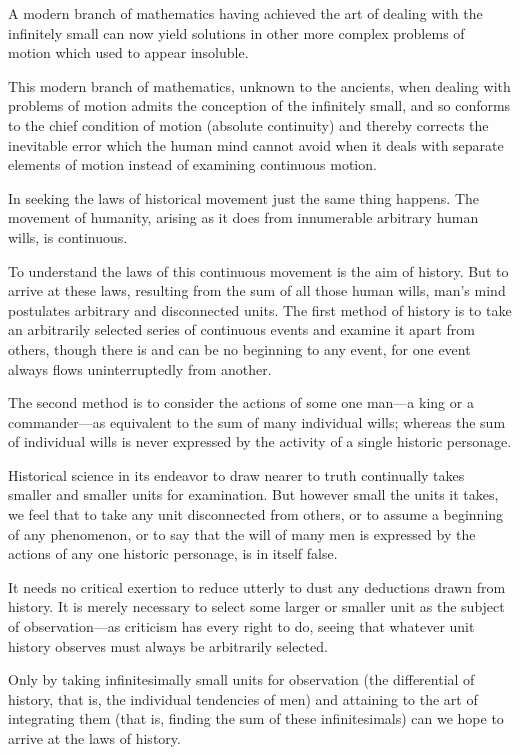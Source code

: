 A modern branch of mathematics having achieved the art of dealing
with the infinitely small can now yield solutions in other more
complex problems of motion which used to appear insoluble.

This modern branch of mathematics, unknown to the ancients, when
dealing with problems of motion admits the conception of the
infinitely small, and so conforms to the chief condition of
motion (absolute continuity) and thereby corrects the inevitable
error which the human mind cannot avoid when it deals with
separate elements of motion instead of examining continuous
motion.

In seeking the laws of historical movement just the same thing
happens.  The movement of humanity, arising as it does from
innumerable arbitrary human wills, is continuous.

To understand the laws of this continuous movement is the aim of
history. But to arrive at these laws, resulting from the sum of
all those human wills, man's mind postulates arbitrary and
disconnected units. The first method of history is to take an
arbitrarily selected series of continuous events and examine it
apart from others, though there is and can be no beginning to any
event, for one event always flows uninterruptedly from another.

The second method is to consider the actions of some one man---a
king or a commander---as equivalent to the sum of many individual
wills; whereas the sum of individual wills is never expressed by
the activity of a single historic personage.

Historical science in its endeavor to draw nearer to truth
continually takes smaller and smaller units for examination. But
however small the units it takes, we feel that to take any unit
disconnected from others, or to assume a beginning of any
phenomenon, or to say that the will of many men is expressed by
the actions of any one historic personage, is in itself false.

It needs no critical exertion to reduce utterly to dust any
deductions drawn from history. It is merely necessary to select
some larger or smaller unit as the subject of observation---as
criticism has every right to do, seeing that whatever unit
history observes must always be arbitrarily selected.

Only by taking infinitesimally small units for observation (the
differential of history, that is, the individual tendencies of
men) and attaining to the art of integrating them (that is,
finding the sum of these infinitesimals) can we hope to arrive at
the laws of history.

